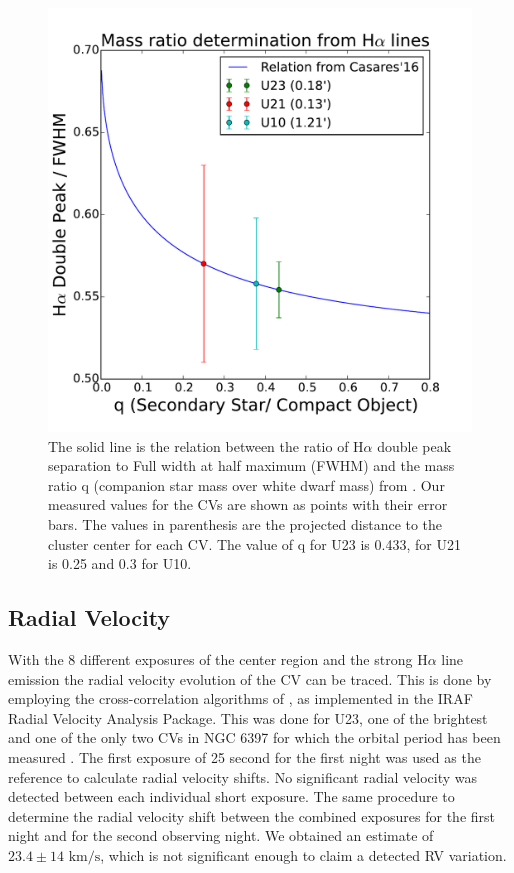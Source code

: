 \begin{figure}[]
        \centering
        \includegraphics[scale=.5]{assets/images/mass.pdf}
        \caption[Mass ratio determination]{The solid line is the relation between the ratio of H$\alpha$ double peak separation to Full width at half maximum (FWHM) and the mass ratio q (companion star mass over white dwarf mass) from \cite{casares_massration_20016}. Our measured values for the CVs are shown as points with their error bars. The values in parenthesis are the projected distance to the cluster center for each CV. The value of q for U23 is 0.433, for U21 is 0.25 and 0.3 for U10.}
\label{fig:mass}
\end{figure}

\subsection{Radial Velocity}

With the 8 different exposures of the center region and the strong H$\alpha$ line emission the radial velocity evolution of the CV can be traced. This is done by employing the cross-correlation algorithms of \cite{tonry_cross_1979}, as implemented in the IRAF Radial Velocity Analysis Package. This was done for U23, one of the brightest and one of the only two CVs in NGC 6397 for which the orbital period has been measured \citep{kaluzny_time_2003}. The first exposure of 25 second for the first night was used as the reference to calculate radial velocity shifts. No significant radial velocity was detected between each individual short exposure.  The same procedure to determine the radial velocity shift between the combined exposures for the first night and for the second observing night. We obtained an estimate of $23.4 \pm 14 \text{ km/s}$, which is not significant enough to claim a detected RV variation.  


